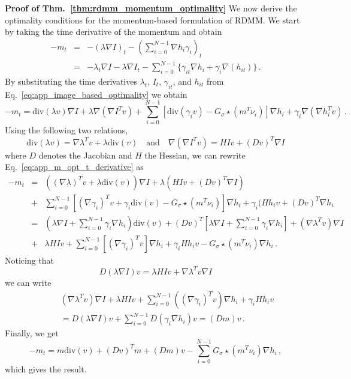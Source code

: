 \documentclass{article}
\numberwithin{equation}{section}
\begin{document}
{\bf Proof of Thm.~\eqref{thm:rdmm_momentum_optimality}}
We now derive the optimality conditions for the momentum-based formulation of RDMM. We start by taking the time derivative of the momentum and obtain
\begin{eqnarray}
-m_t &=& -(\lambda \nabla I)_t - (\sum_{i=0}^{N-1}\nabla h_i\gamma_i)_t\\
&=& -\lambda_t \nabla I - \lambda \nabla I_t - \sum_{i=0}^{N-1} \{ \gamma_{it} \nabla h_i + \gamma_i \nabla(h_{it})\}\,.
\end{eqnarray}
By substituting the time derivatives $\lambda_t$, $I_t$, $\gamma_{it}$, and $h_{it}$ from Eq.~\eqref{eq:app_image_based_optimality} we obtain
\begin{equation}
-m_t = \text{div}(\lambda v)\nabla I + \lambda \nabla (\nabla I^T v) + \sum_{i=0}^{N-1} \left[ \text{div}(\gamma_i v) -G_{\sigma}\star(m^T \nu_i) \right] \nabla h_i
+\gamma_i \nabla(\nabla h_i^T v)\,.
\label{eq:app_m_opt_t_derivative}
\end{equation}
Using the following two relations,
\begin{equation}
    \text{div}(\lambda v) = \nabla \lambda^T v + \lambda \text{div}(v)\quad\text{and}\quad \nabla(\nabla I^Tv) = HIv + (Dv)^T\nabla I
\end{equation}
where $D$ denotes the Jacobian and $H$ the Hessian, we can rewrite Eq.~\eqref{eq:app_m_opt_t_derivative} as
\begin{eqnarray}
-m_t &=& ((\nabla \lambda)^T v + \lambda \text{div}(v))\nabla I + \lambda(HIv+(Dv)^T\nabla I)\\
&+& \sum_{i=0}^{N-1} \left [(\nabla \gamma_i)^T v +\gamma_i \text{div}(v) -G_{\sigma}\star(m^T \nu_i) \right] \nabla h_i + \gamma_i (Hh_i v+ (Dv)^T \nabla h_i\\
&=& (\lambda \nabla I + \sum_{i=0}^{N-1} \gamma_i \nabla h_i)\text{div}(v)+(Dv)^T[\lambda \nabla I + \sum_{i=0}^{N-1} \gamma_i \nabla h_i] +(\nabla \lambda^T v)\nabla I \\
&+& \lambda HIv + \sum_{i=0}^{N-1} \left[ (\nabla \gamma_i)^T v\right]\nabla h_i + \gamma_i H h_iv 
- G_{\sigma}\star(m^T \nu_i)\nabla h_i\,.
\end{eqnarray}
Noticing that
\begin{equation}
    D(\lambda \nabla I)v = \lambda HIv + \nabla\lambda^T v\nabla I
\end{equation}
we can write 
\begin{eqnarray}
    &~&(\nabla\lambda^T v)\nabla I + \lambda HIv + \sum_{i=0}^{N-1}((\nabla\gamma_i)^T v)\nabla h_i + \gamma_i Hh_i v\\
    &~~~~~& = D(\lambda\nabla I)v + \sum_{i=0}^{N-1} D(\gamma_i\nabla h_i)v = (Dm)v\,.
\end{eqnarray}
Finally, we get
\begin{equation}
-m_t = m\text{div}(v) + (Dv)^T m + (Dm)v - \sum_{i=0}^{N-1} G_{\sigma}\star(m^T \nu_i)\nabla h_i\,,
\end{equation}
which gives the result.
\end{document}
